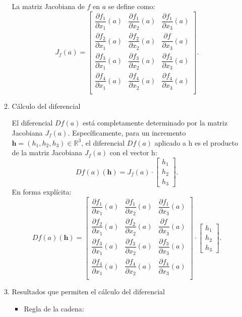 \begin{enumerate}[label=\color{red}\textbf{\arabic*)}, leftmargin=*]
\begin{enumerate}[label=\arabic*)]
La matriz Jacobiana de $f$ en $a$ se define como: $$
J_{f}(a)=\begin{bmatrix}
\dfrac{ \partial f_{1} }{ \partial x_{1} } (a) & \dfrac{ \partial f_{1} }{ \partial x_{2} } (a) & \dfrac{ \partial f_{1} }{ \partial x_{3} } (a) \\
\dfrac{ \partial f_{2} }{ \partial x_{1} } (a) & \dfrac{ \partial f_{2} }{ \partial x_{2} } (a) & \dfrac{ \partial f_{} }{ \partial x_{3} } (a) \\
\dfrac{ \partial f_{3} }{ \partial x_{1} } (a) & \dfrac{ \partial f_{3} }{ \partial x_{2} } (a) & \dfrac{ \partial f_{3} }{ \partial x_{3} } (a) \\
\dfrac{ \partial f_{4} }{ \partial x_{1} } (a) & \dfrac{ \partial f_{4} }{ \partial x_{2} } (a) & \dfrac{ \partial f_{4} }{ \partial x_{3} } (a) \\
\end{bmatrix}.
$$
\item Cálculo del diferencial

El diferencial $Df(a)$ está completamente determinado por la matriz Jacobiana $J_{f}(a)$. Específicamente, para un incremento $\mathbf{h}=(h_{1},h_{2},h_{3})\in\mathbb{R}^{3}$, el diferencial $Df(a)$ aplicado a $\mathrm{h}$ es el producto de la matriz Jacobiana $J_{f}(a)$ con el vector $\mathrm{h}$: $$
Df(a)(\mathbf{h})=J_{f}(a)\cdot \begin{bmatrix}
h_{1} \\
h_{2} \\
h_{3}
\end{bmatrix}.
$$
En forma explícita: $$
Df(a)(\mathbf{h})=\begin{bmatrix}
\dfrac{ \partial f_{1} }{ \partial x_{1} } (a) & \dfrac{ \partial f_{1} }{ \partial x_{2} } (a) & \dfrac{ \partial f_{1} }{ \partial x_{3} } (a) \\
\dfrac{ \partial f_{2} }{ \partial x_{1} } (a) & \dfrac{ \partial f_{2} }{ \partial x_{2} } (a) & \dfrac{ \partial f_{} }{ \partial x_{3} } (a) \\
\dfrac{ \partial f_{3} }{ \partial x_{1} } (a) & \dfrac{ \partial f_{3} }{ \partial x_{2} } (a) & \dfrac{ \partial f_{3} }{ \partial x_{3} } (a) \\
\dfrac{ \partial f_{4} }{ \partial x_{1} } (a) & \dfrac{ \partial f_{4} }{ \partial x_{2} } (a) & \dfrac{ \partial f_{4} }{ \partial x_{3} } (a) \\
\end{bmatrix}\cdot \begin{bmatrix}
h_{1} \\
h_{2} \\
h_{3}
\end{bmatrix}.
$$
\item Resultados que permiten el cálculo del diferencial
\begin{itemize}
\item Regla de la cadena:


\end{itemize}
\end{enumerate}
\end{enumerate}
